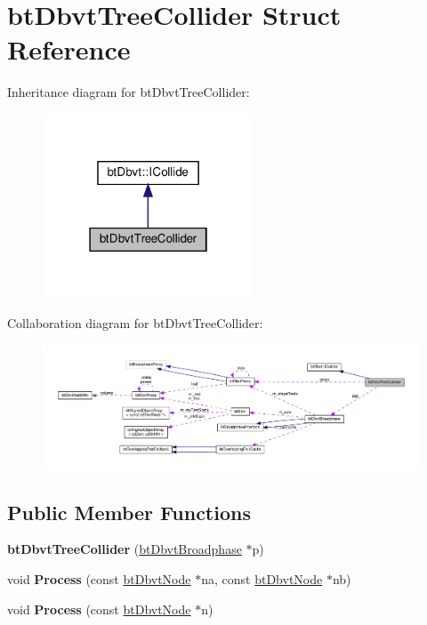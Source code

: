 \hypertarget{structbtDbvtTreeCollider}{}\section{bt\+Dbvt\+Tree\+Collider Struct Reference}
\label{structbtDbvtTreeCollider}


Inheritance diagram for bt\+Dbvt\+Tree\+Collider\+:
\nopagebreak
\begin{figure}[H]
\begin{center}
\leavevmode
\includegraphics[width=178pt]{structbtDbvtTreeCollider__inherit__graph}
\end{center}
\end{figure}


Collaboration diagram for bt\+Dbvt\+Tree\+Collider\+:
\nopagebreak
\begin{figure}[H]
\begin{center}
\leavevmode
\includegraphics[width=350pt]{structbtDbvtTreeCollider__coll__graph}
\end{center}
\end{figure}
\subsection*{Public Member Functions}
\begin{DoxyCompactItemize}
\item 
\mbox{\label{structbtDbvtTreeCollider_a9925bcef1817340b3369ce3cb77d389b}} 
{\bfseries bt\+Dbvt\+Tree\+Collider} (\hyperlink{structbtDbvtBroadphase}{bt\+Dbvt\+Broadphase} $\ast$p)
\item 
\mbox{\label{structbtDbvtTreeCollider_af619e8432192242e345f92964dcab260}} 
void {\bfseries Process} (const \hyperlink{structbtDbvtNode}{bt\+Dbvt\+Node} $\ast$na, const \hyperlink{structbtDbvtNode}{bt\+Dbvt\+Node} $\ast$nb)
\item 
\mbox{\label{structbtDbvtTreeCollider_a99e02cc1370b1e1e1fd4a1468d8dca34}} 
void {\bfseries Process} (const \hyperlink{structbtDbvtNode}{bt\+Dbvt\+Node} $\ast$n)
\end{DoxyCompactItemize}
